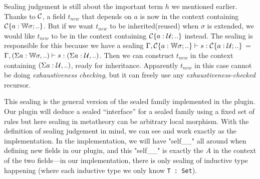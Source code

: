 Sealing judgement is still about the important term $h$ we mentioned
earlier. Thanks to ${\mathcal{C}}$, a field $t_{new}$ that depends on $a$ is now
in the context containing ${\mathcal{C}}\{a : {\mathbb{W}} \sigma; ..\}$.
But if we want $t_{new}$ to be inherited(reused) when $\sigma$ is
extended, we would like $t_{new}$ to be in the context containing
${\mathcal{C}}\{a : {\mathcal{U}}; ..\}$ instead. The sealing is responsible for this
because we have a sealing ${ {\Gamma, {\mathcal{C}}\{a : {\mathbb{W}} \sigma;
..\}} \vdash {s} : {{\mathcal{C}}\{a : {\mathcal{U}}; ..\}} }$ = ${ {\Gamma, (\Sigma a : {\mathbb{W}}
\sigma,..)} \vdash {s} : {(\Sigma a : {\mathcal{U}},..)} }$. Then we can construct
$t_{new}$ in the context containing $(\Sigma a : {\mathcal{U}},..)$, ready for
inheritance.
Apparently $t_{new}$ in this case cannot be doing \textit{exhaustiveness
checking}, but it can freely use any \textit{exhaustiveness-checked}
recursor.




This sealing is the general version of the sealed family implemented in the plugin. Our plugin will deduce a sealed ``interface'' for a sealed family using a fixed set of rules but here sealing in metatheory can be arbitrary local morphism. With the definition of sealing judgement in mind, we can see
 and  work exactly as the
implementation. In the implementation, we will have "self__" all around
when defining new fields in our plugin, and this "self__" is exactly the
$A$ in the context of the two fields---in our implementation, there is only sealing of inductive type happening (where each inductive type we only know \texttt{T : Set}).


